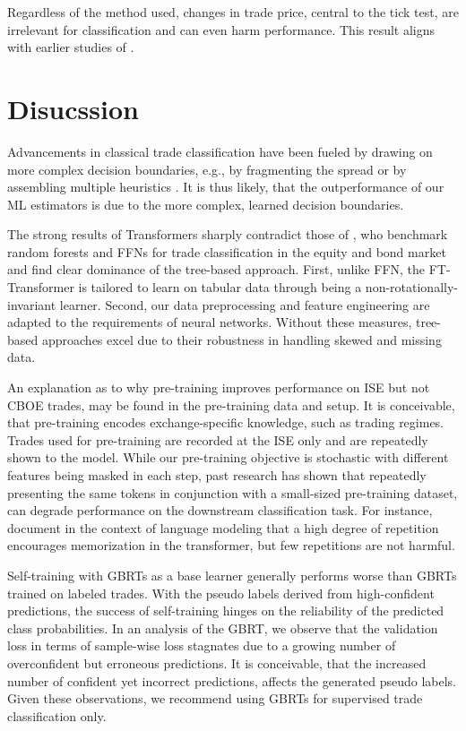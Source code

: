 Regardless of the method used, changes in trade price, central to the tick test, are irrelevant for classification and can even harm performance. This result aligns with earlier studies of \textcites{savickasInferringDirectionOption2003}{grauerOptionTradeClassification2022}.

\section{Disucssion}

Advancements in classical trade classification have been fueled by drawing on more complex decision boundaries, e.g., by fragmenting the spread \autocites{ellisAccuracyTradeClassification2000}{chakrabartyTradeClassificationAlgorithms2007} or by assembling multiple heuristics \autocite{grauerOptionTradeClassification2022}. It is thus likely, that the outperformance of our \gls{ML} estimators is due to the more complex, learned decision boundaries.

The strong results of Transformers sharply contradict those of \textcite[][]{ronenMachineLearningTrade2022}, who benchmark random forests and \glspl{FFN} for trade classification in the equity and bond market and find clear dominance of the tree-based approach. First, unlike \gls{FFN}, the FT-Transformer is tailored to learn on tabular data through being a non-rotationally-invariant learner. Second, our data preprocessing and feature engineering are adapted to the requirements of neural networks. Without these measures, tree-based approaches excel due to their robustness in handling skewed and missing data.

An explanation as to why pre-training improves performance on \gls{ISE} but not \gls{CBOE} trades, may be found in the pre-training data and setup. It is conceivable, that pre-training encodes exchange-specific knowledge, such as trading regimes. Trades used for pre-training are recorded at the \gls{ISE} only and are repeatedly shown to the model. While our pre-training objective is stochastic with different features being masked in each step, past research has shown that repeatedly presenting the same tokens in conjunction with a small-sized pre-training dataset, can degrade performance on the downstream classification task. For instance, \textcite[][]{raffelExploringLimitsTransfer2020} document in the context of language modeling that a high degree of repetition encourages memorization in the transformer, but few repetitions are not harmful.

Self-training with \glspl{GBRT} as a base learner generally performs worse than \glspl{GBRT} trained on labeled trades. With the pseudo labels derived from high-confident predictions, the success of self-training hinges on the reliability of the predicted class probabilities. In an analysis of the \gls{GBRT}, we observe that the validation loss in terms of sample-wise loss stagnates due to a growing number of overconfident but erroneous predictions. It is conceivable, that the increased number of confident yet incorrect predictions, affects the generated pseudo labels. Given these observations, we recommend using \glspl{GBRT} for supervised trade classification only. 

